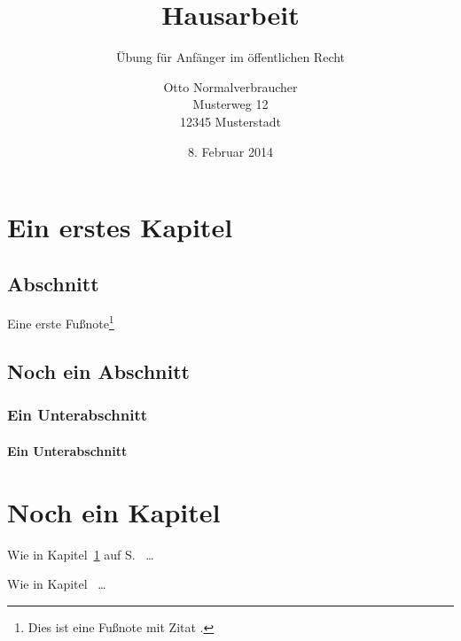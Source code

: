 \documentclass[hagen]{hausarbeit-jura}
\begin{document}
\title{Hausarbeit}
\subtitle{Übung für Anfänger im öffentlichen Recht}
\author{Otto Normalverbraucher\\Musterweg 12\\12345 Musterstadt}
\date{8. Februar 2014}
\maketitle

\tableofcontents %

\chapter{Ein erstes Kapitel}\label{chap:ErstesKapitel}

\section{Abschnitt}
\blindtext[4]

Eine erste Fußnote\footnote{Dies ist eine Fußnote mit Zitat \cite[348, 349]{hau98}.}

\section{Noch ein Abschnitt}
\blindtext

\subsection{Ein Unterabschnitt}
\blindtext

\subsubsection{Ein Unterabschnitt}
\blindtext

\blindtext

\blindtext

\blindtext

\blindtext

\blindtext

\blindtext

\chapter{Noch ein Kapitel}
Wie in Kapitel~\ref{chap:ErstesKapitel} auf S.~\pageref{chap:ErstesKapitel} \ldots

Wie in Kapitel~ \ldots
\end{document}
